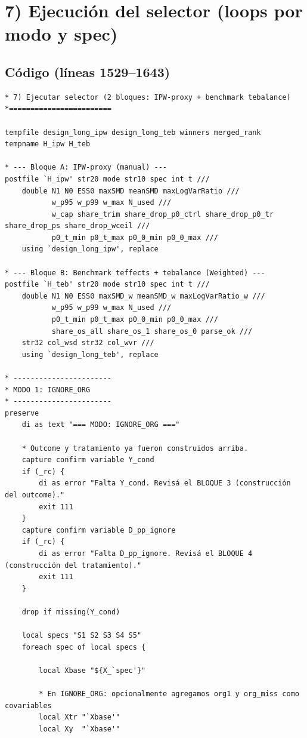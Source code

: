 \documentclass[12pt]{article}
\begin{document}
\section{7) Ejecución del selector (loops por modo y spec)}\label{sec:runselector}
\subsection*{Código (líneas 1529--1643)}
\begin{lstlisting}
* 7) Ejecutar selector (2 bloques: IPW-proxy + benchmark tebalance)
*========================

tempfile design_long_ipw design_long_teb winners merged_rank
tempname H_ipw H_teb

* --- Bloque A: IPW-proxy (manual) ---
postfile `H_ipw' str20 mode str10 spec int t ///
    double N1 N0 ESS0 maxSMD meanSMD maxLogVarRatio ///
           w_p95 w_p99 w_max N_used ///
           w_cap share_trim share_drop_p0_ctrl share_drop_p0_tr share_drop_ps share_drop_wceil ///
           p0_t_min p0_t_max p0_0_min p0_0_max ///
    using `design_long_ipw', replace

* --- Bloque B: Benchmark teffects + tebalance (Weighted) ---
postfile `H_teb' str20 mode str10 spec int t ///
    double N1 N0 ESS0 maxSMD_w meanSMD_w maxLogVarRatio_w ///
           w_p95 w_p99 w_max N_used ///
           p0_t_min p0_t_max p0_0_min p0_0_max ///
           share_os_all share_os_1 share_os_0 parse_ok ///
    str32 col_wsd str32 col_wvr ///
    using `design_long_teb', replace

* -----------------------
* MODO 1: IGNORE_ORG
* -----------------------
preserve
    di as text "=== MODO: IGNORE_ORG ==="

    * Outcome y tratamiento ya fueron construidos arriba.
    capture confirm variable Y_cond
    if (_rc) {
        di as error "Falta Y_cond. Revisá el BLOQUE 3 (construcción del outcome)."
        exit 111
    }
    capture confirm variable D_pp_ignore
    if (_rc) {
        di as error "Falta D_pp_ignore. Revisá el BLOQUE 4 (construcción del tratamiento)."
        exit 111
    }

    drop if missing(Y_cond)

    local specs "S1 S2 S3 S4 S5"
    foreach spec of local specs {

        local Xbase "${X_`spec'}"

        * En IGNORE_ORG: opcionalmente agregamos org1 y org_miss como covariables
        local Xtr "`Xbase'"
        local Xy  "`Xbase'"


\end{lstlisting}
\end{document}
